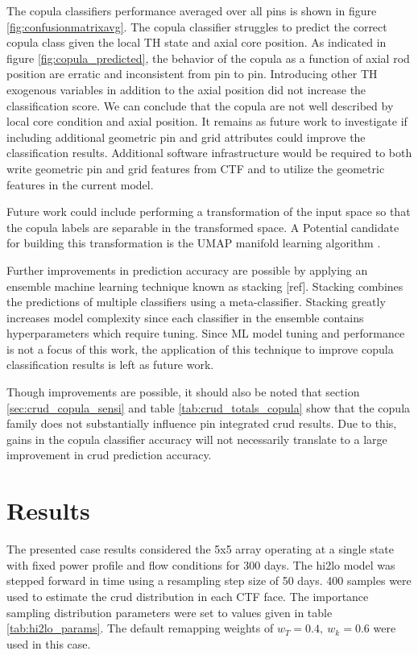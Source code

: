 The copula classifiers performance averaged over all pins is shown in figure \ref{fig:confusionmatrixavg}. The copula classifier struggles to predict the correct copula class given the local TH state and axial core position.  As indicated in figure \ref{fig:copula_predicted}, the behavior of the copula as a function of axial rod position are erratic and inconsistent from pin to pin.  Introducing other TH exogenous variables in addition to the axial position did not increase the classification score.  We can conclude that the copula are not well described by local core condition and axial position.  It remains as future work to investigate if including additional geometric pin and grid attributes could improve the classification results.  Additional software infrastructure would be required to both write geometric pin and grid features from CTF and to utilize the geometric features in the current model.

Future work could include performing a transformation of the input space so that the copula labels are separable in the transformed space.  A Potential candidate for building this transformation is the UMAP manifold learning algorithm \cite{UMAP18}.

Further improvements in prediction accuracy are possible by applying an ensemble
machine learning technique known as stacking [ref].  Stacking combines the predictions of multiple classifiers using a meta-classifier.
Stacking greatly increases model complexity since each classifier in the ensemble contains hyperparameters which require tuning.
Since ML model tuning and performance is not a focus of this work, the application of this technique to improve copula classification results is left as future work.

Though improvements are possible, it should also be noted that section \ref{sec:crud_copula_sensi} and table \ref{tab:crud_totals_copula} show that the copula family does not substantially influence pin integrated crud results.  Due to this, gains in the copula classifier accuracy will not necessarily translate to a large improvement in crud prediction accuracy.

\section{Results}

The presented case results considered the 5x5 array operating at a single state with fixed power profile and flow conditions for 300 days.  The hi2lo model was stepped forward in time using a resampling step size of 50 days.  400 samples were used to estimate the crud distribution in each CTF face.  The importance sampling distribution parameters were set to values given in table \ref{tab:hi2lo_params}.  The default remapping weights of $w_T=0.4, \ w_k=0.6$ were used in this case.

